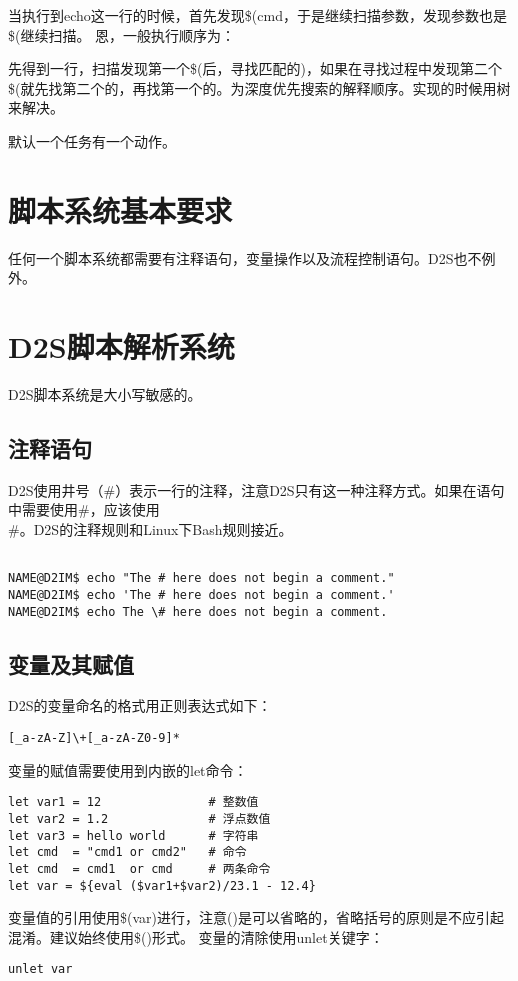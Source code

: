 当执行到echo这一行的时候，首先发现\$(cmd，于是继续扫描参数，发现参数也是\$(继续扫描。
恩，一般执行顺序为：

先得到一行，扫描发现第一个\$(后，寻找匹配的)，如果在寻找过程中发现第二个\$(就先找第二个的，再找第一个的。为深度优先搜索的解释顺序。实现的时候用树来解决。









默认一个任务有一个动作。
\section{脚本系统基本要求}
任何一个脚本系统都需要有注释语句，变量操作以及流程控制语句。D2S也不例外。
\section{D2S脚本解析系统}
D2S脚本系统是大小写敏感的。

\subsection{注释语句}
D2S使用井号（\#）表示一行的注释，注意D2S只有这一种注释方式。如果在语句中需要使用\#，应该使用\\\#。D2S的注释规则和Linux下Bash规则接近。

\begin{lstlisting}

NAME@D2IM$ echo "The # here does not begin a comment."
NAME@D2IM$ echo 'The # here does not begin a comment.'
NAME@D2IM$ echo The \# here does not begin a comment.
\end{lstlisting}

\subsection{变量及其赋值}
D2S的变量命名的格式用正则表达式如下：
\begin{lstlisting}
[_a-zA-Z]\+[_a-zA-Z0-9]*
\end{lstlisting}
变量的赋值需要使用到内嵌的let命令：
\begin{lstlisting}
let var1 = 12               # 整数值
let var2 = 1.2              # 浮点数值
let var3 = hello world      # 字符串
let cmd  = "cmd1 or cmd2"   # 命令
let cmd  = cmd1  or cmd     # 两条命令
let var = ${eval ($var1+$var2)/23.1 - 12.4}
\end{lstlisting}
变量值的引用使用\$(var)进行，注意()是可以省略的，省略括号的原则是不应引起混淆。建议始终使用\$()形式。
变量的清除使用unlet关键字：
\begin{lstlisting}
unlet var
\end{lstlisting}

